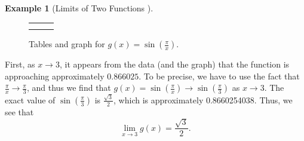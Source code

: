 \documentclass[10pt,]{book}
\theoremstyle{plain}
\theoremstyle{definition}
\theoremstyle{definition}
\theoremstyle{definition}
\newtheorem{example}[theorem]{Example}
\theoremstyle{definition}
\theoremstyle{definition}
\numberwithin{equation}{section}
\newlength{\panelmax}
\begin{document}
\begin{example}[Limits of Two Functions
  ]
{{}
\newlength{\phHimage}\setlength{\phHimage}{\ht\panelboxHimage+\dp\panelboxHimage}
\settototalheight{\phHimage}{\usebox{\panelboxHimage}}
\setlength{\panelmax}{\maxof{\panelmax}{\phHimage}}
\leavevmode%
\setlength{\tabcolsep}{0\textwidth}
\begin{figure}
\begin{tabular}{@{}*{3}{c}@{}}
\begin{minipage}[c][\panelmax][t]{0.333333333333333\textwidth}\usebox{\panelboxCtabular}\end{minipage}&
\begin{minipage}[c][\panelmax][t]{0.333333333333333\textwidth}\usebox{\panelboxDtabular}\end{minipage}&
\begin{minipage}[c][\panelmax][t]{0.333333333333333\textwidth}\usebox{\panelboxHimage}\end{minipage}\tabularnewline
\parbox[t]{0.333333333333333\textwidth}{
}&
\parbox[t]{0.333333333333333\textwidth}{
}&
\parbox[t]{0.333333333333333\textwidth}{
}\end{tabular}
\caption{Tables and graph for \(g(x) = \sin(\frac{\pi}{x})\). \label{F-1-2-Ex1g}}
\end{figure}
}%
\par

    First, as \(x \to 3\), it appears from the data (and the graph) that the function is approaching approximately \(0.866025\). To be precise, we have to use the fact that \(\frac{\pi}{x} \to \frac{\pi}{3}\), and thus we find that \(g(x) = \sin(\frac{\pi}{x}) \to \sin(\frac{\pi}{3})\) as \(x \to 3\). The exact value of \(\sin(\frac{\pi}{3})\) is \(\frac{\sqrt{3}}{2}\), which is approximately 0.8660254038. Thus, we see that
\begin{equation*}
    \lim_{x \to 3} g(x) = \frac{\sqrt{3}}{2}.
    \end{equation*}\par


\end{example}
\end{document}
